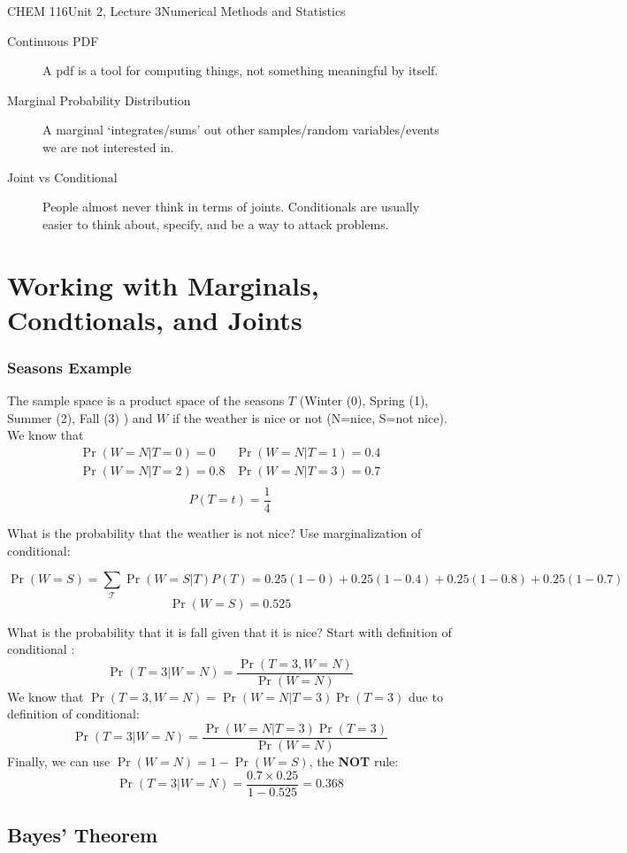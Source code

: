 \documentclass{article}
\begin{document}
\begin{tdoc}{CHEM 116}{Unit 2, Lecture 3}{Numerical Methods and Statistics}
\begin{description}
\item[Continuous PDF] A pdf is a tool for computing things, not
  something meaningful by itself.

\item[Marginal Probability Distribution] A marginal `integrates/sums'
  out other samples/random variables/events we are not interested in.

\item[Joint vs Conditional] People almost never think in terms of
  joints. Conditionals are usually easier to think about, specify, and
  be a way to attack problems.

\end{description}

 \section{Working with Marginals, Condtionals, and Joints}

\subsubsection{Seasons Example}

The sample space is a product space of the seasons $T$ (Winter (0), Spring
(1), Summer (2), Fall (3) ) and $W$ if the weather is nice or not (N=nice,
S=not nice). We know that
\[
\begin{array}{lr}
\Pr(W=N|T=0) = 0 & \Pr(W=N|T=1) = 0.4\\
\Pr(W=N|T=2) = 0.8 & \Pr(W=N|T=3) = 0.7\\
\end{array}
\]
\[
P(T=t) = \frac{1}{4}
\]

What is the probability that the weather is not nice? Use
marginalization of conditional:

\[
\Pr(W=S) = \sum_\mathcal{T} \Pr(W=S | T) P(T) = 0.25(1 - 0) + 0.25(1 - 0.4) + 0.25(1 - 0.8) + 0.25(1 - 0.7)
\]
\[
\Pr(W=S) = 0.525
\]

What is the probability that it is fall given that it is nice? Start with definition of conditional :
\[
\Pr(T=3|W=N) = \frac{\Pr(T=3, W=N)}{\Pr(W=N)}
\]
We know that $\Pr(T=3, W=N) = \Pr(W=N|T=3)\Pr(T=3)$ due to definition of conditional:
\[
\Pr(T=3|W=N) = \frac{\Pr(W=N|T=3)\Pr(T=3)}{\Pr(W=N)}
\]
Finally, we can use $\Pr(W=N) = 1 - \Pr(W=S)$, the {\bf NOT} rule:
\[
\Pr(T=3|W=N) = \frac{0.7\times 0.25}{1 - 0.525} = 0.368
\]

\subsection{Bayes' Theorem}


\end{tdoc}
\end{document}
